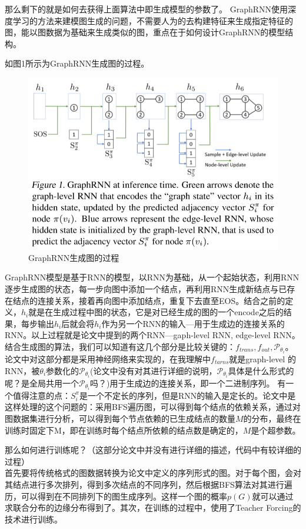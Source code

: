 那么剩下的就是如何去获得上面算法中即生成模型的参数了。
GraphRNN使用深度学习的方法来建模图生成的问题，不需要人为的去构建特征来生成指定特征的图，能以图数据为基础来生成类似的图，重点在于如何设计GraphRNN的模型结构。
\par 如图1所示为GraphRNN生成图的过程。
\begin{figure}[h]
    \centering
    \includegraphics[width=.8\textwidth]{pics/GrpahRNN.png}
    \caption{GraphRNN生成图的过程}
\end{figure}

GraphRNN模型是基于RNN的模型，以RNN为基础，从一个起始状态，利用RNN逐步生成图的状态，每一步向图中添加一个结点，再利用RNN生成新结点与已存在结点的连接关系，接着再向图中添加结点，重复下去直至EOS。结合之前的定义，$h_i$就是在生成过程中图的状态，它是对已经生成的图的一个encode之后的结果，每步输出$h_i$后就会将$h_i$作为另一个RNN的输入---用于生成边的连接关系的RNN。以上过程就是论文中提到的两个RNN---gaph-level RNN, edge-level RNN。
结合生成图的算法，我们可以知道有这几个部分是比较关键的：$f_{trans}, f_{out}, \mathcal{P}_{\theta_i}$。论文中对这部分都是采用神经网络来实现的，在我理解中$f_{tarns}$就是graph-level 的RNN，被$\theta_i$参数化的$\mathcal{P}_{\theta_i}$({\color{red}论文中没有对其进行详细的说明，$\mathcal{P}_{\theta_i}$具体是什么形式的呢？是全局共用一个$\mathcal{P}_{\theta_i}$吗？})用于生成边的连接关系，即一个二进制序列。
有一个值得注意的点：$S^{\pi}_i$是一个不定长的序列，但是RNN的输入是定长的。论文中是这样处理的这个问题的：采用BFS遍历图，可以得到每个结点的依赖关系，通过对图数据集进行分析，可以得到每个节点依赖的已生成结点的数量$M$的分布，最终在训练时固定下M，即在训练时每个结点所依赖的结点数是确定的，$M$是个超参数。

\par 那么如何进行训练呢？（这部分论文中并没有进行详细的描述，代码中有较详细的过程）\\
首先要将传统格式的图数据转换为论文中定义的序列形式的图。对于每个图，会对其结点进行多次排列，得到多次结点的不同序列，然后根据BFS算法对其进行遍历，可以得到在不同排列下的图生成序列。这样一个图的概率$p(G)$就可以通过求联合分布的边缘分布得到了。其次，在训练的过程中，使用了Teacher Forcing的技术进行训练。



